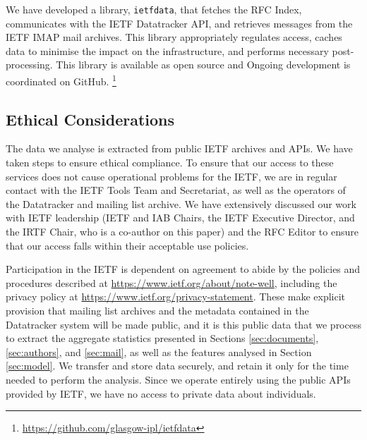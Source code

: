 \documentclass[twocolumn,10pt]{article}
\newcommand{\pb}[1]{\vspace{0.75ex}\noindent{\textbf{#1}}}
\begin{document}

\pb{Reproducibility and data access:}
We have developed a library, \texttt{ietfdata}, that fetches the RFC
Index, communicates with the IETF Datatracker API, and retrieves messages
from the IETF IMAP mail archives. This library appropriately regulates
access, caches data to minimise the impact on the infrastructure, and
performs necessary post-processing. This library is available as open
source and Ongoing development is coordinated on GitHub.%
\footnote{\url{https://github.com/glasgow-ipl/ietfdata}}


\subsection{Ethical Considerations}
\label{sec:ethics}


The data we analyse is extracted from public IETF archives and APIs.  We
have taken steps to ensure ethical compliance.  To ensure that our access
to these services does not cause operational problems for the IETF, we are
in regular contact with the IETF Tools Team and Secretariat, as well as the
operators of the Datatracker and mailing list archive.  We have extensively
discussed our work with IETF leadership (IETF and IAB Chairs, the IETF
Executive Director, and the IRTF Chair, who is a co-author on this paper)
and the RFC Editor to ensure that our access falls within their acceptable
use policies.

Participation in the IETF is dependent on agreement to abide by the
policies and procedures described at \url{https://www.ietf.org/about/note-well},
including the privacy policy at \url{https://www.ietf.org/privacy-statement}.
These make explicit provision that mailing list archives and the metadata
contained in the Datatracker system will be made public, and it is this
public data that we process to extract the aggregate statistics presented
in Sections \ref{sec:documents}, \ref{sec:authors}, and \ref{sec:mail}, as
well as the features analysed in Section \ref{sec:model}. We transfer and
store data securely, and retain it only for the time needed to perform the
analysis.  Since we operate entirely using the public APIs provided by
IETF, we have no access to private data about individuals.
\end{document}
